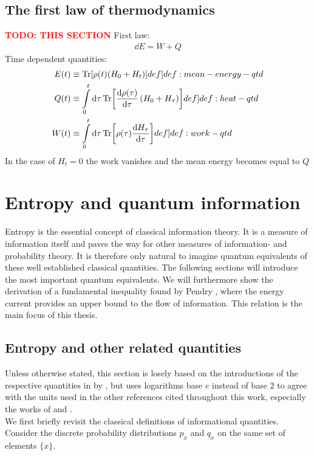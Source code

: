 \documentclass{book}
\numberwithin{equation}{section} %
\begin{document}
\subsection{The first law of thermodynamics}
\textcolor{red}{\textbf{TODO: THIS SECTION}}
First law:
\begin{align}
    \dd E = {W} + {Q}
\end{align}
Time dependent quantities:\cite{BA_Alicki_1979}
\begin{align}
    E(t) &\equiv \Tr[\rho(t)(H_0+H_t)]\label[def]{def:mean-energy-qtd}\\
    Q(t) &\equiv \int\limits_0^t\dd\tau\Tr[\dv{\rho(\tau)}{\tau} \left(H_0 + H_\tau\right)]\label[def]{def:heat-qtd}\\
    W(t) &\equiv \int\limits_0^t\dd\tau\Tr[\rho(\tau)\dv{H_\tau}{\tau}]\label[def]{def:work-qtd}
\end{align}
In the case of $H_t = 0$ the work vanishes and the mean energy becomes equal to $Q$
\newpage
\section{Entropy and quantum information}
Entropy is the essential concept of classical information theory.
It is a measure of information itself and paves the way for other measures of information-
and probability theory.
It is therefore only natural to imagine quantum equivalents of these well established classical quantities.
The following sections will introduce the most important quantum equivalents.
We will furthermore show the derivation of a fundamental inequality found by Pendry \cite{BA_Pendry_1983}, where the energy
current provides an upper bound to the flow of information. This relation is the main focus of this thesis.
\subsection{Entropy and other related quantities}\label{sec:entropy-rel-quant}
Unless otherwise stated, this section is losely based on the introductions of the respective quantities in
 by ,
but uses logarithms base $e$ instead of base 2
to agree with the units used in the other references cited throughout this work,
especially the works of \citeauthor{BA_Pendry_1983} \cite*{BA_Pendry_1983} and \citeauthor{BA_kaonan_correlations} \cite*{BA_kaonan_correlations}.\\
We first briefly revisit the classical definitions of informational quantities.
Consider the discrete probability distributions $p_x$ and $q_x$ on the same set of elements $\{x\}$.
\end{document}
